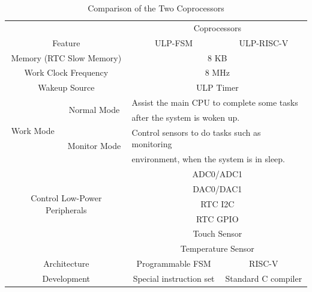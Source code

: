 \documentclass[main\_\_EN.tex]{subfiles}
\begin{document}
\begin{table}[!ht]
    \centering
     \begin{tabular}[c]{| c | c | c | c |}
    \hline
    \multicolumn{2}{|c}{} & \multicolumn{2}{|c|}{Coprocessors}         \\
    \cline{3-4}
    \multicolumn{2}{|c|}{\multirow{-2}{*}{Feature}} & ULP-FSM & ULP-RISC-V  \\
    \hline
    \multicolumn{2}{|c}{Memory (RTC Slow Memory) }  & \multicolumn{2}{|c|}{8 KB}  \\
    \hline
    \multicolumn{2}{|c}{Work Clock Frequency} & \multicolumn{2}{|c|}{8 MHz} \\
    \hline
    \multicolumn{2}{|c}{Wakeup Source} & \multicolumn{2}{|c|}{ULP Timer} \\
    \hline
    \multirow{4}{*}{Work Mode} & \multirow{2}{*}{Normal Mode} & \multicolumn{2}{l|}{Assist the main CPU to complete some tasks } \\
    & &  \multicolumn{2}{l|}{after the system is woken up.} \\
    \cline{2-4}
    & \multirow{2}{*}{Monitor Mode} & \multicolumn{2}{l|}{Control sensors to do tasks such as monitoring} \\
    & & \multicolumn{2}{l|}{ environment, when the system is in sleep.} \\
    \hline
    \multicolumn{2}{|c}{\multirow{5}{*}{Control Low-Power Peripherals}} & \multicolumn{2}{|c|}{ ADC0/ADC1 }    \\
    \cline{3-4}
     \multicolumn{2}{|c}{} & \multicolumn{2}{|c|}{DAC0/DAC1}  \\
    \cline{3-4}
    \multicolumn{2}{|c}{} & \multicolumn{2}{|c|}{RTC I2C}  \\
    \cline{3-4}
    \multicolumn{2}{|c}{} & \multicolumn{2}{|c|}{RTC GPIO}  \\
     \cline{3-4}
    \multicolumn{2}{|c}{} & \multicolumn{2}{|c|}{Touch Sensor}  \\
     \cline{3-4}
    \multicolumn{2}{|c}{} & \multicolumn{2}{|c|}{Temperature Sensor}   \\
    \hline
    \multicolumn{2}{|c|}{Architecture} & Programmable FSM & RISC-V\\
    \hline
    \multicolumn{2}{|c|}{Development} & Special instruction set & Standard C compiler \\
    \hline
    \end{tabular}
    \caption{Comparison of the Two Coprocessors}
\end{table}
\end{document}
